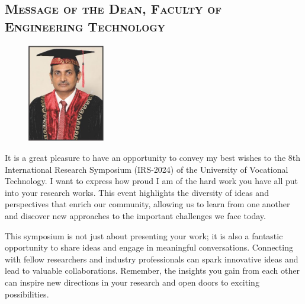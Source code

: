 \thispagestyle{fancy}
	
	\vspace{-2em} %
	\begin{center}



\subsection*{\textsc{Message of the Dean, Faculty of Engineering Technology}}
	\end{center}

   
    
    \begin{figure}
		\includegraphics[width=0.3\textwidth]{Images/DeanFET.jpeg}
	\end{figure}
	\vspace{2em} %




		It is a great pleasure to have an opportunity to convey my best wishes to the 8th International Research Symposium (IRS-2024) of the University of Vocational Technology. I want to express how proud I am of the hard work you have all put into your research works. This event highlights the diversity of ideas and perspectives that enrich our community, allowing us to learn from one another and discover new approaches to the important challenges we face today.
        
This symposium is not just about presenting your work; it is also a fantastic opportunity to share ideas and engage in meaningful conversations. Connecting with fellow researchers and industry professionals can spark innovative ideas and lead to valuable collaborations. Remember, the insights you gain from each other can inspire new directions in your research and open doors to exciting possibilities.

